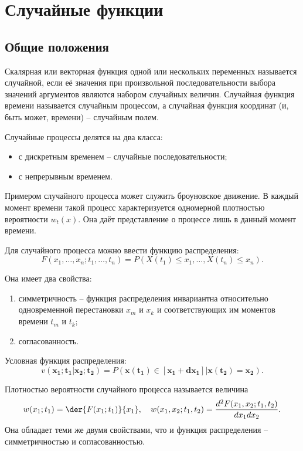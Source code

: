 \section{Случайные функции}
\subsection{Общие положения}
Скалярная или векторная функция одной или нескольких переменных называется
случайной, если её значения при произвольной последовательности выбора значений
аргументов являются набором случайных величин. Случайная функция времени
называется случайным процессом, а случайная функция координат (и, быть может,
времени) -- случайным полем.

Случайные процессы делятся на два класса:
\begin{itemize}
    \item с дискретным временем -- случайные последовательности;
    \item с непрерывным временем.
\end{itemize}

Примером случайного процесса может служить броуновское движение. В каждый момент
времени такой процесс характеризуется одномерной плотностью вероятности
\( w_t(x) \). Она даёт представление о процессе лишь в данный момент времени.

Для случайного процесса можно ввести функцию распределения:
\[
    F(x_1, \ldots, x_n; t_1, \ldots, t_n) =
        P(X(t_1) \le x_1, \ldots, X(t_n) \le x_n).
\]

Она имеет два свойства:
\begin{enumerate}
    \item симметричность -- функция распределения инвариантна относительно
        одновременной перестановки \( x_m \) и \( x_k \) и соответствующих
        им моментов времени \( t_m \) и \( t_k \);
    \item согласованность.
\end{enumerate}

Условная функция распределения:
\[
    v(\mathbf{x_1};\mathbf{t_1}|\mathbf{x_2};\mathbf{t_2}) =
    P(\mathbf{x}(\mathbf{t_1})\in[\mathbf{x_1}+\mathbf{dx_1}]|
        \mathbf{x}(\mathbf{t_2})=\mathbf{x_2}).
\]

Плотностью вероятности случайного процесса называется величина
\[
    w(x_1;t_1) = \der{F(x_1;t_1)}{x_1},\quad
    w(x_1,x_2;t_1,t_2) = \frac{d^2F(x_1,x_2;t_1,t_2)}{dx_1 dx_2}.
\]
Она обладает теми же двумя свойствами, что и функция распределения --
симметричностью и согласованностью.

